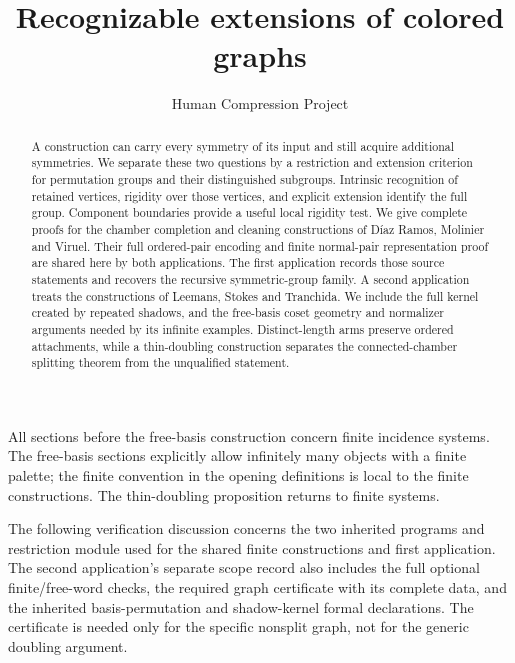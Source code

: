 
\title{Recognizable extensions of colored graphs}
\author{Human Compression Project}
\date{}

\maketitle
\begin{abstract}
A construction can carry every symmetry of its input and still acquire additional
symmetries. We separate these two questions by a restriction and extension
criterion for permutation groups and their distinguished subgroups. Intrinsic
recognition of retained vertices, rigidity over those vertices, and explicit
extension identify the full group. Component boundaries provide a useful local
rigidity test. We give complete proofs for the chamber completion and cleaning
constructions of D\'iaz Ramos, Molinier and Viruel. Their full ordered-pair encoding and finite normal-pair representation
proof are shared here by both applications. The first application records
those source statements and recovers the recursive symmetric-group family. A second application treats the
constructions of Leemans, Stokes and Tranchida. We include the full kernel
created by repeated shadows, and the free-basis coset geometry and normalizer
arguments needed by its infinite examples. Distinct-length arms preserve
ordered attachments, while a thin-doubling construction separates the
connected-chamber splitting theorem from the unqualified statement.
\end{abstract}
All sections before the free-basis construction concern finite incidence
systems. The free-basis
sections explicitly allow infinitely many objects with a finite palette;
the finite convention in the opening definitions is local to the finite
constructions. The thin-doubling proposition returns to finite systems.







The following verification discussion concerns the two inherited programs
and restriction module used for the shared finite constructions and first
application. The second application's
separate scope record also includes the full optional finite/free-word checks,
the required graph certificate with its complete data, and the inherited
basis-permutation and shadow-kernel formal declarations. The certificate is
needed only for the specific nonsplit graph, not for the generic doubling
argument.


